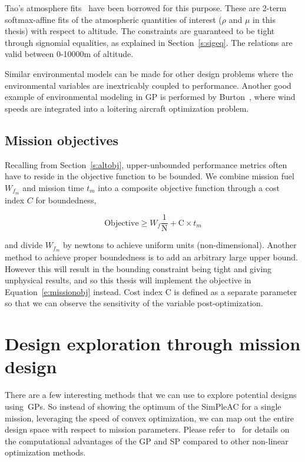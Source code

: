 Tao's atmosphere fits~\cite{tao_thesis} have been borrowed for this purpose. These are
2-term softmax-affine fits of the atmospheric
quantities of interest ($\rho$ and $\mu$ in this thesis) with respect to altitude. The constraints
are guaranteed to be tight through signomial equalities, as explained in Section~\ref{s:sigeq}.
The relations are valid between 0-10000m of altitude.

Similar environmental models can be made for other design problems where the environmental
variables are inextricably coupled to performance. Another good example of environmental modeling
in \gls{GP} is performed by Burton~\cite{gassolar}, where wind speeds are integrated into
a loitering aircraft optimization problem.

\subsection{Mission objectives}
\label{s:missionobj}

Recalling from Section~\ref{s:altobj}, upper-unbounded performance metrics often have to
reside in the objective function to be bounded. We combine mission fuel $W_{f_m}$ and mission time $t_m$
into a composite objective function through a cost index $C$ for boundedness,

\begin{equation}
    \mathrm{Objective} \geq W_f \frac{1}{\mathrm{N}} + \mathrm{C} \times t_m
    \label{e:missionobj}
\end{equation}

and divide $W_{f_m}$ by newtons to achieve uniform units (non-dimensional).
Another method to achieve proper boundedness is to add an arbitrary large upper bound. However
this will result in the bounding constraint being tight and giving unphysical results, and so
this thesis will implement the objective in Equation~\ref{e:missionobj} instead.
Cost index $\mathrm{C}$ is defined as a separate parameter so that we can observe the sensitivity
of the variable post-optimization.

\section{Design exploration through mission design}

There are a few interesting methods that we can use to explore
potential designs using~\gls{GP}s. So instead of showing the optimum of the
SimPleAC for a single mission, leveraging the speed of convex optimization,
we can map out the entire design space with respect to mission parameters.
Please refer to~\cite{power_of_log} for details on the computational advantages of the \gls{GP}
and \gls{SP} compared to other non-linear optimization methods.

